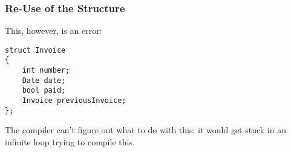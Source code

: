 \begin{frame}[fragile]
\frametitle{Re-Use of the Structure}

This, however, is an error:

\begin{verbatim}
struct Invoice
{
    int number;
    Date date;
    bool paid;
    Invoice previousInvoice;
};
\end{verbatim}

The compiler can't figure out what to do with this; it would get stuck in an infinite loop trying to compile this.

\end{frame}




